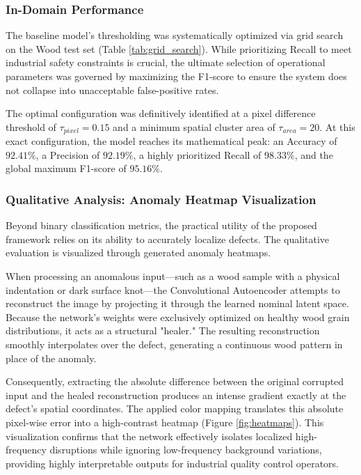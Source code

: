 \documentclass[10pt,twocolumn,a4paper]{article}
\begin{document}
\subsubsection{In-Domain Performance}
The baseline model's thresholding was systematically optimized via grid search on the Wood test set (Table \ref{tab:grid_search}). While prioritizing Recall to meet industrial safety constraints is crucial, the ultimate selection of operational parameters was governed by maximizing the F1-score to ensure the system does not collapse into unacceptable false-positive rates. 

The optimal configuration was definitively identified at a pixel difference threshold of $\tau_{pixel}=0.15$ and a minimum spatial cluster area of $\tau_{area}=20$. At this exact configuration, the model reaches its mathematical peak: an Accuracy of $92.41\%$, a Precision of $92.19\%$, a highly prioritized Recall of $98.33\%$, and the global maximum F1-score of $95.16\%$.

\subsubsection{Qualitative Analysis: Anomaly Heatmap Visualization}
Beyond binary classification metrics, the practical utility of the proposed framework relies on its ability to accurately localize defects. The qualitative evaluation is visualized through generated anomaly heatmaps.

When processing an anomalous input—such as a wood sample with a physical indentation or dark surface knot—the Convolutional Autoencoder attempts to reconstruct the image by projecting it through the learned nominal latent space. Because the network's weights were exclusively optimized on healthy wood grain distributions, it acts as a structural "healer." The resulting reconstruction smoothly interpolates over the defect, generating a continuous wood pattern in place of the anomaly. 

Consequently, extracting the absolute difference between the original corrupted input and the healed reconstruction produces an intense gradient exactly at the defect's spatial coordinates. The applied color mapping translates this absolute pixel-wise error into a high-contrast heatmap (Figure \ref{fig:heatmaps}). This visualization confirms that the network effectively isolates localized high-frequency disruptions while ignoring low-frequency background variations, providing highly interpretable outputs for industrial quality control operators.
\end{document}
